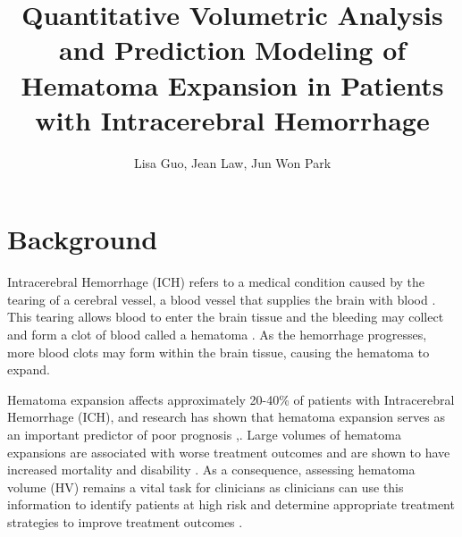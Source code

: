 \documentclass[11pt, journal, a4paper]{IEEEtran}
\begin{document}

\title{Quantitative Volumetric Analysis and Prediction Modeling of Hematoma Expansion in Patients with Intracerebral Hemorrhage}
\author{Lisa Guo, Jean Law, Jun Won Park}
\maketitle



\section{Background}
\label{sec:background}
Intracerebral Hemorrhage (ICH) refers to a medical condition caused by the tearing of a cerebral vessel, a blood vessel that supplies the brain with blood \cite{puy2023intracerebral}. This tearing allows blood to enter the brain tissue and the bleeding may collect and form a clot of blood called a hematoma \cite{hematoma}. As the hemorrhage progresses, more blood clots may form within the brain tissue, causing the hematoma to expand. 

Hematoma expansion affects approximately 20-40\% of patients with Intracerebral Hemorrhage (ICH), and research has shown that hematoma expansion serves as an important predictor of poor prognosis \cite{chen2017predictors},\cite{li2020hematoma}. Large volumes of hematoma expansions are associated with worse treatment outcomes and are shown to have increased mortality and disability \cite{dowlatshahi2011defining}. 
As a consequence, assessing hematoma volume (HV) remains a vital task for clinicians as clinicians can use this information to identify patients at high risk and determine appropriate treatment strategies to improve treatment outcomes \cite{haupenthal2023hematoma}. 
\end{document}
